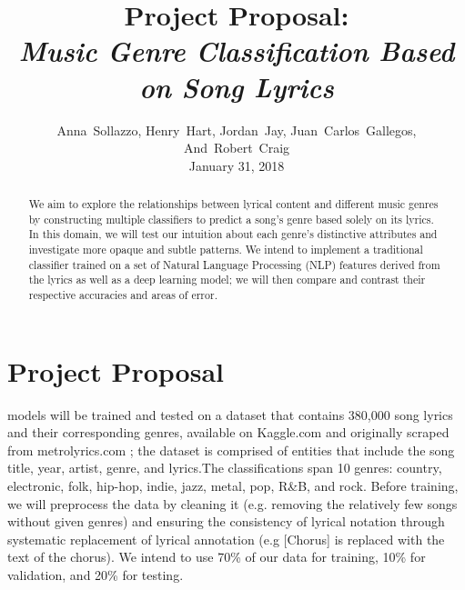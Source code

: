 \documentclass[journal]{IEEEtran}
\begin{document}
\title{Project Proposal:\\\emph{Music Genre Classification Based on Song Lyrics}}

\author{Anna~Sollazzo,
        Henry~Hart,
        Jordan~Jay,
        Juan~Carlos~Gallegos,
        And~Robert~Craig \\ January 31, 2018}
        
\maketitle


\begin{abstract}

    We aim to explore the relationships between lyrical content and different music genres by constructing multiple classifiers to predict a song's genre based solely on its lyrics. In this domain, we will test our intuition about each genre's distinctive attributes and investigate more opaque and subtle patterns. We intend to implement a traditional classifier trained on a set of Natural Language Processing (NLP) features derived from the lyrics as well as a deep learning model; we will then compare and contrast their respective accuracies and areas of error.\par

\end{abstract}

\section{Project Proposal}

     models will be trained and tested on a dataset that contains 380,000 song lyrics and their corresponding genres, available on Kaggle.com and originally scraped from metrolyrics.com \cite{KaggleDataset}; the dataset is comprised of entities that include the song title, year, artist, genre, and lyrics.The classifications span 10 genres: country, electronic, folk, hip-hop, indie, jazz, metal, pop, R\&B, and rock. Before training, we will preprocess the data by cleaning it (e.g. removing the relatively few songs without given genres) and ensuring the consistency of lyrical notation through systematic replacement of lyrical annotation (e.g [Chorus] is replaced with the text of the chorus). We intend to use 70\% of our data for training, 10\% for validation, and 20\% for testing. \par
\end{document}
